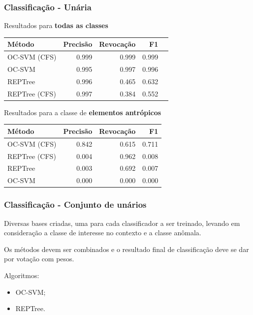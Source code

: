 \documentclass[t]{beamer}
\begin{document}
\begin{frame}[c]
	\frametitle{Classificação - Unária}

	\centering
	Resultados para \textbf{todas as classes}

	\small{
		\begin{table}[h]
		\centering
		\begin{tabulary}{\linewidth}{|L|R|R|R|R|}
		\hline
		\textbf{Método} & \textbf{Precisão} & \textbf{Revocação} & \textbf{F1} \\ \hline
		OC-SVM (CFS)  & 0.999 & 0.999 & 0.999 \\ \hline
		OC-SVM        & 0.995 & 0.997 & 0.996 \\ \hline
		REPTree       & 0.996 & 0.465 & 0.632 \\ \hline
		REPTree (CFS) & 0.997 & 0.384 & 0.552 \\ \hline
		\end{tabulary}
		\end{table}
	}

	\centering
	Resultados para a classe de \textbf{elementos antrópicos}

	\small{
		\begin{table}[h]
		\centering
		\begin{tabulary}{\linewidth}{|L|R|R|R|}
		\hline
		\textbf{Método} & \textbf{Precisão} & \textbf{Revocação} & \textbf{F1} \\ \hline
		OC-SVM (CFS)  & 0.842 & 0.615 & 0.711 \\ \hline
		REPTree (CFS) & 0.004 & 0.962 & 0.008 \\ \hline
		REPTree       & 0.003 & 0.692 & 0.007 \\ \hline
		OC-SVM        & 0.000 & 0.000 & 0.000 \\ \hline
		\end{tabulary}
		\end{table}
	}
\end{frame}

\begin{frame}[c]
	\frametitle{Classificação - Conjunto de unários}

	Diversas bases criadas, uma para cada classificador a ser treinado, levando em consideração a classe de interesse no contexto e a classe anômala.

	\vspace{0.5cm}

	Os métodos devem ser combinados e o resultado final de classificação deve se dar por votação com pesos.

	\vspace{0.5cm}

	Algoritmos:
	\begin{itemize}
		\item OC-SVM;
		\item REPTree.
	\end{itemize}
\end{frame}
\end{document}
